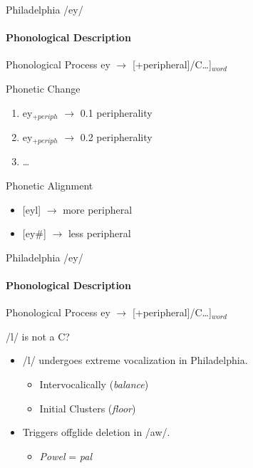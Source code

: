 \documentclass[]{beamer}
\begin{document}
\begin{frame}{Philadelphia /ey/}
	\framesubtitle{Phonological Description}
	
	\begin{block}{Phonological Process}
		ey $\rightarrow$ [+peripheral]/\underline{\hskip 15pt}C\ldots]$_{word}$
	\end{block}
	
	\begin{block}{Phonetic Change}
		\begin{enumerate}
			\item ey$_{+periph}$ $\rightarrow$ 0.1 peripherality
			\item ey$_{+periph}$ $\rightarrow$ 0.2 peripherality
			\item \ldots
		\end{enumerate}
	\end{block}
	
	\begin{block}{Phonetic Alignment}
		\begin{itemize}
			\item {[}eyl] $\rightarrow$ more peripheral
			\item {[}ey\#] $\rightarrow$ less peripheral
		\end{itemize}
	\end{block}
\end{frame}

\begin{frame}{Philadelphia /ey/}
	\framesubtitle{Phonological Description}
	
	\begin{block}{Phonological Process}
		ey $\rightarrow$ [+peripheral]/\underline{\hskip 15pt}C\ldots]$_{word}$
	\end{block}
	\begin{block}{/l/ is not a C?}
		\begin{itemize}
			\item /l/ undergoes extreme vocalization in Philadelphia.
				\begin{itemize}
					\item Intervocalically ({\it balance})
					\item Initial Clusters ({\it floor})
				\end{itemize}
			\item Triggers offglide deletion in /aw/.
				\begin{itemize}
					\item {\it Powel} = {\it pal}
				\end{itemize}
		\end{itemize}
		
	\end{block}
\end{frame}
\end{document}
